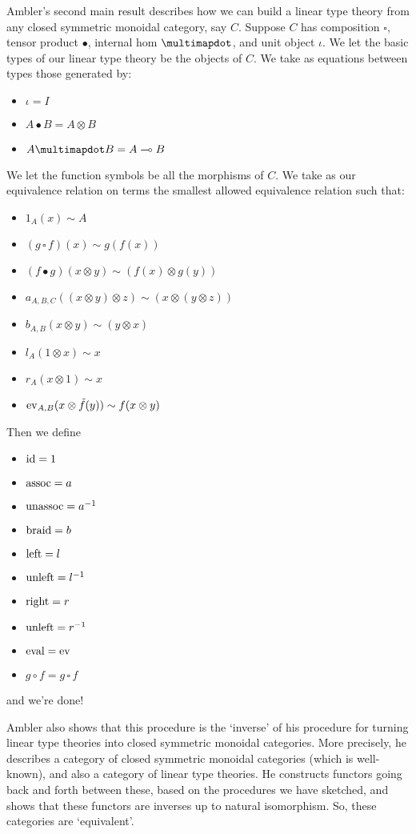 \documentclass[12pt]{article}
\newcommand{\lhom}{\multimap}
\newcommand{\tensor}{\otimes}
\newcommand{\Id}{{\rm id}}
\newcommand{\ev}{{\rm ev}}
\newcommand{\eval}{{\rm eval}}
\newcommand{\assoc}{{\rm assoc}}
\newcommand{\unassoc}{{\rm unassoc}}
\newcommand{\braid}{{\rm braid}}
\newcommand{\Left}{{\rm left}}
\newcommand{\Right}{{\rm right}}
\newcommand{\unleft}{{\rm unleft}}
\begin{document}
Ambler's second main result describes how we can build a linear type
theory from any closed symmetric monoidal category, say $C$.  Suppose $C$ 
has composition $\square$, tensor product $\bullet$, internal hom
$\multimapdot$, and unit object $\iota$.  We let the basic types of
our linear type theory be the objects of $C$.  We take as equations
between types those generated by:
\begin{itemize}
  \item $\iota = I$
  \item $A \bullet B = A \tensor B$
  \item $A \multimapdot B = A \lhom B$
\end{itemize}
We let the function symbols be all the morphisms of $C$.  We 
take as our equivalence relation on terms the smallest allowed
equivalence relation such that:
\begin{itemize}
  \item $1_A(x) \sim A$
  \item $(g \,\square\, f)(x) \sim g (f(x))$
  \item $(f \bullet g)(x \tensor y) \sim (f(x) \tensor g(y))$
  \item $a_{A,B,C}((x \tensor y) \tensor z) \sim (x \tensor (y \tensor z))$
  \item $b_{A, B}(x \tensor y) \sim (y \tensor x)$
  \item $l_A(1 \tensor x) \sim x$
  \item $r_A(x \tensor 1) \sim x$
  \item $\ev_{A, B}(x \tensor \tilde{f}(y)) \sim f(x \tensor y)$
\end{itemize}
Then we define
\begin{itemize}
  \item $\Id = 1$
  \item $\assoc = a$
  \item $\unassoc = a^{-1}$
  \item $\braid = b$
  \item $\Left = l$
  \item $\unleft = l^{-1}$
  \item $\Right = r$
  \item $\unleft = r^{-1}$
  \item $\eval = \ev$
  \item $g \circ f = g \,\square\, f$
\end{itemize}
and we're done!

Ambler also shows that this procedure is the `inverse' of his
procedure for turning linear type theories into closed symmetric
monoidal categories.  More precisely, he describes a category of
closed symmetric monoidal categories (which is well-known), and also a
category of linear type theories.  He constructs functors going back
and forth between these, based on the procedures we have sketched, and
shows that these functors are inverses up to natural isomorphism.
So, these categories are `equivalent'.
\end{document}

